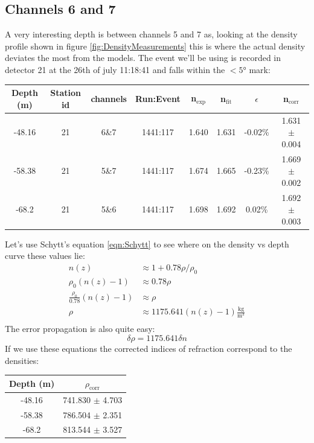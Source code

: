 \documentclass[11pt,a4paper,faculty=we,language=en,doctype=report]{cls/ugent-doc}
\begin{document}
\subsection{Channels 6 and 7}
A very interesting depth is between channels 5 and 7  as, looking at
the density profile shown in figure \ref{fig:DensityMeasurements}
this is where the actual density deviates the most from the models.
The event we'll be using is recorded in detector 21 at the 26th of
july 11:18:41 and falls within the $<5$° mark:
\begin{center}
\begin{tabular}{||c c c c c c c c||}
 \hline
 Depth (m) & Station id & channels & Run:Event & n$_\text{exp}$ & n$_\text{fit}$ & $\epsilon$ & n$_\text{corr}$\\ [0.5ex]
 \hline\hline
 -48.16 & 21 & 6\&7 & 1441:117 & 1.640 & 1.631 & -0.02\% & 1.631 $\pm$ 0.004 \\
 -58.38 & 21 & 5\&7 & 1441:117 & 1.674 & 1.665 & -0.23\% & 1.669 $\pm$ 0.002 \\
 -68.2 & 21 & 5\&6 & 1441:117 & 1.698 & 1.692 & 0.02\% & 1.692 $\pm$ 0.003 \\
 \hline
\end{tabular}
\end{center}
Let's use Schytt's equation \ref{eqn:Schytt} to see where
on the density vs depth curve these values lie:
\begin{align}
	n(z) &\approx 1 + 0.78\rho/\rho_0\\
	\rho_0(n(z) - 1) &\approx 0.78\rho\\
	\frac{\rho_0}{0.78}(n(z) - 1) &\approx \rho\\
	\rho &\approx 1175.641(n(z) - 1)\frac{\text{kg}}{\text{m}^3}\\
\end{align}
The error propagation is also quite easy:
\begin{equation}
	\delta \rho = 1175.641\delta n
\end{equation}
If we use these equations the corrected indices of refraction
correspond to the densities:
\begin{center}
\begin{tabular}{||c c||}
 \hline
 Depth (m) & $\rho_\text{corr}$\\ [0.5ex]
 \hline\hline
 -48.16 & 741.830 $\pm$ 4.703 \\
 -58.38 & 786.504 $\pm$ 2.351 \\
 -68.2 & 813.544 $\pm$ 3.527 \\
 \hline
\end{tabular}
\end{center}
\end{document}
